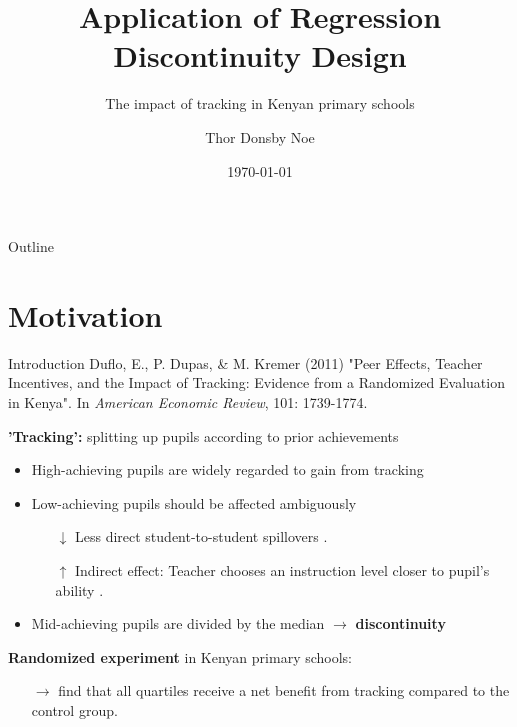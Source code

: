 \documentclass[9pt]{beamer}
\title{Application of Regression Discontinuity Design}
\subtitle{The impact of tracking in Kenyan primary schools}
\date{\today}
\author{Thor Donsby Noe}
\institute{Analysis \& Evaluation of Public Policies}
\numberwithin{equation}{section}
\begin{document}
\maketitle


\begin{frame}{Outline}
  \tableofcontents

\end{frame}


\section{Motivation}

\begin{frame}{Introduction}
  Duflo, E., P. Dupas, \& M. Kremer (2011) "Peer Effects, Teacher Incentives, and the Impact of Tracking: Evidence from a Randomized Evaluation in Kenya". In \textit{American Economic Review}, 101: 1739-1774.

  \textbf{'Tracking':} splitting up pupils according to prior achievements
  \begin{itemize}
    \item High-achieving pupils are widely regarded to gain from tracking
    \item Low-achieving pupils should be affected ambiguously
    \begin{itemize}
      \item[$\downarrow$] Less direct student-to-student spillovers \citep{epple2002ability}.
      \item[$\uparrow$] Indirect effect: Teacher chooses an instruction level closer to pupil's ability \citep{figlio2002school, zimmer2003new, lefgren2004educational}.
    \end{itemize}
    \item Mid-achieving pupils are divided by the median $\rightarrow$ \textbf{discontinuity}
  \end{itemize}
\textbf{Randomized experiment} in Kenyan primary schools:
\begin{itemize}
  \item[$\rightarrow$] \citet{duflo2011peer} find that all quartiles receive a net benefit from tracking compared to the control group.
\end{itemize}
\end{frame}
\end{document}
